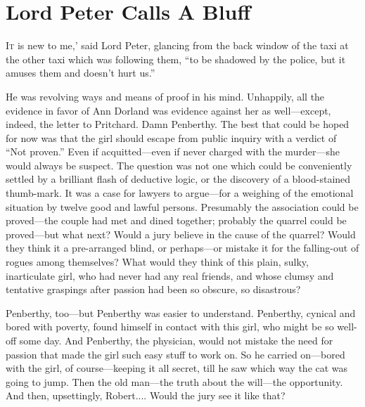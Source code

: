 \chapter{Lord Peter Calls A Bluff}

\lettrine[lines=4,ante=‘]{I}{t} is new to me,' said Lord Peter, glancing from the back window of the taxi at the other taxi which was following them, \enquote{to be shadowed by the police, but it amuses them and doesn't hurt us.}

He was revolving ways and means of proof in his mind. Unhappily, all the evidence in favor of Ann Dorland was evidence against her as well\allowbreak---\allowbreak except, indeed, the letter to Pritchard. Damn Penberthy. The best that could be hoped for now was that the girl should escape from public inquiry with a verdict of \enquote{Not proven.} Even if acquitted\allowbreak---\allowbreak even if never charged with the murder\allowbreak---\allowbreak she would always be suspect. The question was not one which could be conveniently settled by a brilliant flash of deductive logic, or the discovery of a blood-stained thumb-mark. It was a case for lawyers to argue\allowbreak---\allowbreak for a weighing of the emotional situation by twelve good and lawful persons. Presumably the association could be proved\allowbreak---\allowbreak the couple had met and dined together; probably the quarrel could be proved\allowbreak---\allowbreak but what next? Would a jury believe in the cause of the quarrel? Would they think it a pre-arranged blind, or perhaps\allowbreak---\allowbreak or mistake it for the falling-out of rogues among themselves? What would they think of this plain, sulky, inarticulate girl, who had never had any real friends, and whose clumsy and tentative graspings after passion had been so obscure, so disastrous?

Penberthy, too\allowbreak---\allowbreak but Penberthy was easier to understand. Penberthy, cynical and bored with poverty, found himself in contact with this girl, who might be so well-off some day. And Penberthy, the physician, would not mistake the need for passion that made the girl such easy stuff to work on. So he carried on\allowbreak---\allowbreak bored with the girl, of course\allowbreak---\allowbreak keeping it all secret, till he saw which way the cat was going to jump. Then the old man\allowbreak---\allowbreak the truth about the will\allowbreak---\allowbreak the opportunity. And then, upsettingly, Robert.... Would the jury see it like that?

